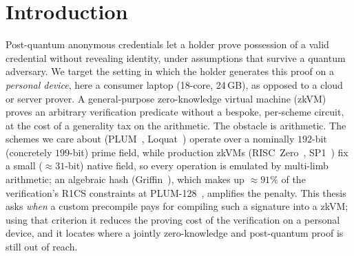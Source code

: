 \section{Introduction}
Post-quantum anonymous credentials let a holder prove possession of a valid credential without revealing identity, under assumptions that survive a quantum adversary. We target the setting in which the holder generates this proof on a \emph{personal device}, here a consumer laptop (18-core, 24\,GB), as opposed to a cloud or server prover. A general-purpose zero-knowledge virtual machine (zkVM) proves an arbitrary verification predicate without a bespoke, per-scheme circuit, at the cost of a generality tax on the arithmetic. The obstacle is arithmetic. The schemes we care about (PLUM~\cite{10.1007/978-981-95-2961-2_6}, Loquat~\cite{cryptoeprint:2024/868}) operate over a nominally $192$-bit (concretely $199$-bit) prime field, while production zkVMs (RISC~Zero~\cite{bruestle2023risczero}, SP1~\cite{succinct2024sp1}) fix a small ($\approx 31$-bit) native
field, so every operation is emulated by multi-limb arithmetic; an algebraic
hash (Griffin~\cite{cryptoeprint:2022/403}), which makes up $\approx 91\%$ of the verification's R1CS constraints at PLUM-128~\cite[\S4.2]{10.1007/978-981-95-2961-2_6}, amplifies the penalty. This thesis asks \emph{when} a custom precompile pays for compiling such a signature into a zkVM; using that criterion it reduces the proving cost of the verification on a personal device, and it locates where a jointly zero-knowledge
and post-quantum proof is still out of reach.

